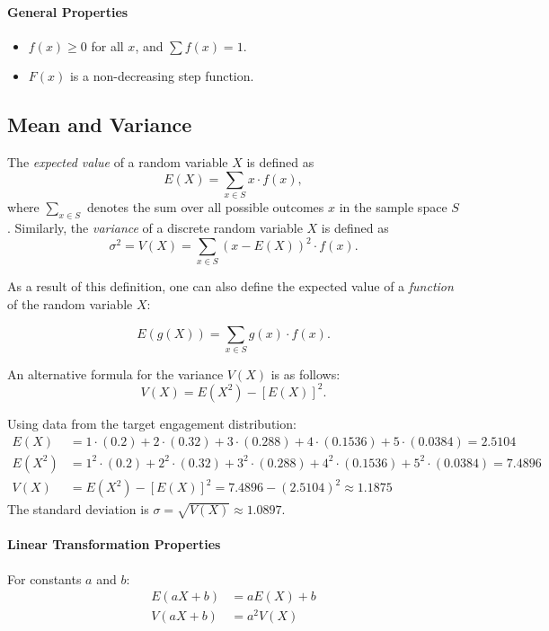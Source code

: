 \paragraph{General Properties}
    \begin{itemize}
        \item $f(x) \ge 0$ for all $x$, and $\sum f(x) = 1$.
        \item $F(x)$ is a non-decreasing step function.
    \end{itemize}

\subsection*{Mean and Variance}

\begin{definition}
The \emph{expected value} of a random variable $X$ is defined as
\[
    E(X) = \sum_{x \in S} x \cdot f(x),
\]
where $\sum_{x \in S}$ denotes the sum over all possible outcomes $x$ in the sample space $S$.
Similarly, the \emph{variance} of a discrete random variable $X$ is defined as
\[
    \sigma^2 = V(X) = \sum_{x \in S} (x - E(X))^2 \cdot f(x).
\]

\end{definition}

As a result of this definition, one can also define the expected value of a \emph{function} of the random variable $X$:

\[
    E\left(g(X)\right) = \sum_{x \in S} g(x) \cdot f(x).
\]

An alternative formula for the variance $V(X)$ is as follows:
\[
    V(X) = E\left(X^2\right) - [E(X)]^2.
\]

\begin{example}
    Using data from the target engagement distribution:
    \begin{align*}
        E(X) &= 1\cdot(0.2) + 2\cdot(0.32) + 3\cdot(0.288) + 4\cdot(0.1536) + 5\cdot(0.0384) = 2.5104 \\
        E(X^2) &= 1^2\cdot(0.2) + 2^2\cdot(0.32) + 3^2\cdot(0.288) + 4^2\cdot(0.1536) + 5^2\cdot(0.0384) = 7.4896 \\
        V(X) &= E(X^2) - [E(X)]^2 = 7.4896 - (2.5104)^2 \approx 1.1875
    \end{align*}
    The standard deviation is $\sigma = \sqrt{V(X)} \approx 1.0897$.
\end{example}

\paragraph{Linear Transformation Properties}
For constants $a$ and $b$:
\begin{align*}
    E(aX + b) &= a E(X) + b \\
    V(aX + b) &= a^2 V(X)
\end{align*}


